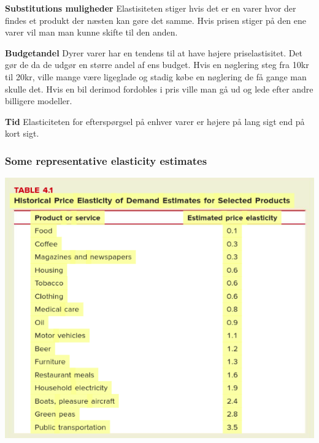 \textbf{Substitutions muligheder}
Elastisiteten stiger hvis det er en varer hvor der findes et produkt der næsten kan gøre det samme. Hvis prisen stiger på den ene varer vil man man kunne skifte til den anden. 

\textbf{Budgetandel}
Dyrer varer har en tendens til at have højere priselastisitet. Det gør de da de udgør en større andel af ens budget. Hvis en nøglering steg fra 10kr til 20kr, ville mange være ligeglade og stadig købe en nøglering de få gange man skulle det. Hvis en bil derimod fordobles i pris ville man gå ud og lede efter andre billigere modeller. 

\textbf{Tid}
Elasticiteten for efterspørgsel på enhver varer er højere på lang sigt end på kort sigt. 

\subsubsection{Some representative elasticity estimates}
\includegraphics[scale=0.8]{Afsnit/Lektion1/Elastisitet.png}

